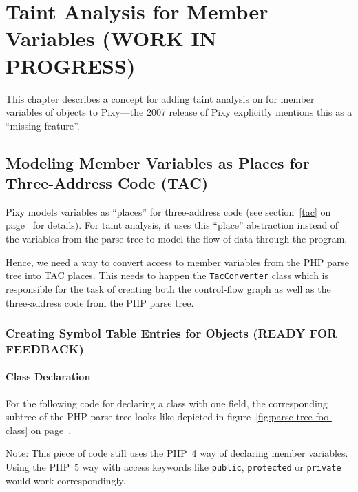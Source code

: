 \chapter{Taint Analysis for Member Variables (WORK IN PROGRESS)}
\label{field-tainting}

This chapter describes a concept for adding taint analysis on for member variables of objects to Pixy---the 2007 release of Pixy explicitly mentions this as a ``missing feature''.

\section{Modeling Member Variables as Places for Three-Address Code (TAC)}

Pixy models variables as ``places'' for three-address code (see section~\ref{tac} on page~\pageref{tac} for details). For taint analysis, it uses this ``place'' abstraction instead of the variables from the parse tree to model the flow of data through the program.

Hence, we need a way to convert access to member variables from the PHP parse tree into TAC places. This needs to happen the \texttt{TacConverter} class which is responsible for the task of creating both the control-flow graph as well as the three-address code from the PHP parse tree.



\subsection{Creating Symbol Table Entries for Objects (READY FOR FEEDBACK)}

\subsubsection{Class Declaration}

For the following code for declaring a class with one field, the corresponding subtree of the PHP parse tree looks like depicted in figure~\ref{fig:parse-tree-foo-class} on page~\pageref{fig:parse-tree-foo-class}.


Note: This piece of code still uses the PHP~4 way of declaring member variables. Using the PHP~5 way with access keywords like \texttt{public}, \texttt{protected} or \texttt{private} would work correspondingly.

